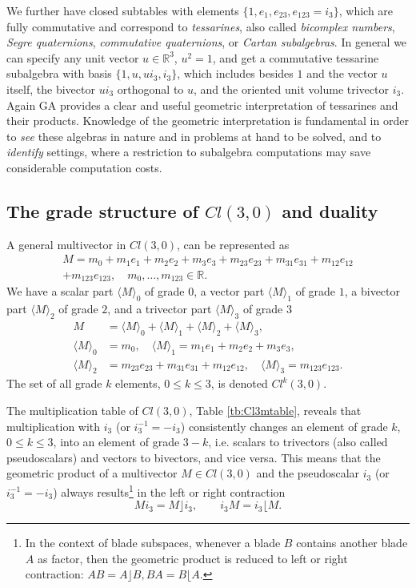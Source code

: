 \documentclass[cameraready]{jcmsi}%
\newcommand{\R}{\mathbb{R}}
\newcommand{\be}{\begin{equation}}
\newcommand{\ee}{\end{equation}}
\begin{document}
We further have closed subtables with elements $\{1, e_1, e_{23}, e_{123}=i_3\}$, which are fully commutative and correspond to \textit{tessarines}, also called \textit{bicomplex numbers}, \textit{Segre quaternions}, \textit{commutative quaternions}, or \textit{Cartan subalgebras}. In general we can specify any unit vector $u\in\R^3$, $u^2=1$, and get a commutative tessarine subalgebra with basis $\{1, u, ui_3, i_3\}$, which includes besides $1$ and the vector $u$ itself, the bivector $ui_3$ orthogonal to $u$, and the oriented unit volume trivector $i_3$. Again GA provides a clear and useful geometric interpretation of tessarines and their products. Knowledge of the geometric interpretation is fundamental in order to \textit{see} these algebras in nature and in problems at hand to be solved, and to \textit{identify} settings, where a restriction to subalgebra computations may save considerable computation costs. 


\subsection{The grade structure of $Cl(3,0)$ and duality}


A general multivector in $Cl(3,0)$, can be represented as
\begin{gather}
  M = m_0 + m_1 e_1 + m_2 e_2 + m_3 e_3 + m_{23} e_{23}
  + m_{31} e_{31}+ m_{12} e_{12}   \nonumber \\
  + m_{123} e_{123}, \quad
  m_0, \ldots , m_{123} \in \R. 
\end{gather}
We have 
a scalar part $\langle M \rangle_0$ of grade $0$, 
a vector part $\langle M \rangle_1$ of grade $1$, 
a bivector part $\langle M \rangle_2$ of grade $2$,
and a trivector part $\langle M \rangle_3$ of grade $3$
\begin{align}
  M &= \langle M \rangle_0 + \langle M \rangle_1 + \langle M \rangle_2 + \langle M \rangle_3,
  \\
   \langle M \rangle_0 &= m_0, \quad
  \langle M \rangle_1 = m_1 e_1 + m_2 e_2 + m_3 e_3, \nonumber \\
  \langle M \rangle_2 &= m_{23} e_{23} + m_{31} e_{31}+ m_{12} e_{12},   
  \quad
  \langle M \rangle_3 = m_{123} e_{123}.
  \nonumber 
\end{align}
The set of all grade $k$ elements, $0 \leq k \leq 3$, is denoted $Cl^k(3,0)$.

The multiplication table of $Cl(3,0)$, Table \ref{tb:Cl3mtable}, reveals that multiplication with $i_3$ (or $i_3^{-1}=-i_3$) consistently changes an element of grade $k$, $0 \leq k \leq 3$, into an element of grade $3-k$, i.e. scalars to trivectors (also called pseudoscalars) and vectors to bivectors, and vice versa. This means that the geometric product of a multivector $M \in Cl(3,0)$ and the pseudoscalar $i_3$ (or $i_3^{-1}=-i_3$) always results\footnote{In the context of blade subspaces, whenever a blade $B$ contains another blade $A$ as factor, then the geometric product is reduced to left or right contraction: $A B = A\rfloor B, 
  B A = B \lfloor A$.} in the left or right contraction
\be 
  M i_3 = M\rfloor i_3, 
  \qquad
  i_3 M = i_3 \lfloor M.
\ee 
\end{document}
